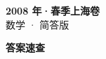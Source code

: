 \documentclass[zihao=-4, a4paper]{ctexart}
\begin{document}
\begin{center}
  {\Large\bfseries 2008 年·春季上海卷}\\[4pt]
  {\large 数学 · 简答版}
\end{center}
\medskip
{}

\clearpage
{}
\begin{center}{\Large\bfseries 答案速查}\end{center}
\medskip

\end{document}
